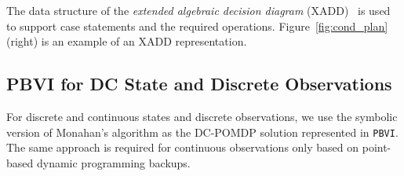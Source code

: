 \documentclass{article} %
\begin{document}
The data structure of the \emph{extended algebraic decision diagram}
(XADD)~\cite{sanner_uai11} is used to support case statements and the
required operations.  Figure~\ref{fig:cond_plan} (right) 
is an example of an XADD representation.

\subsection{PBVI for DC State and Discrete Observations} 
\label{sec:disc_obs}

For discrete and continuous states and discrete observations, we use the symbolic version of Monahan's algorithm as the DC-POMDP solution represented in \texttt{PBVI}. The same approach is required for continuous observations only based on point-based dynamic programming backups.
\end{document}
